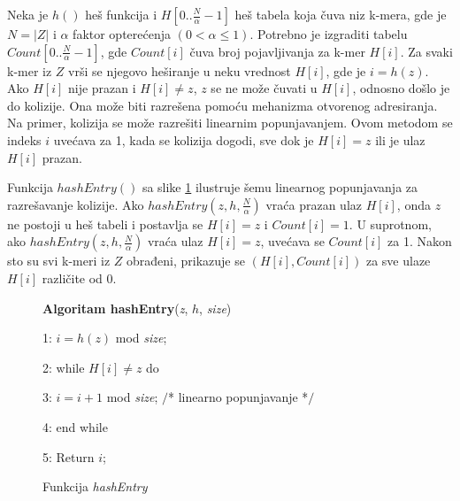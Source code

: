 \documentclass[12pt,oneside]{memoir}
\begin{document}
Neka je $h()$ heš funkcija i $H[0..\frac{N}{\alpha} - 1]$ heš tabela koja čuva niz k-mera, gde je $N = |Z|$ i $\alpha$ faktor opterećenja $(0 < \alpha \leq 1)$. Potrebno je izgraditi tabelu $Count[0..\frac{N}{\alpha} - 1]$, gde $Count[i]$ čuva broj pojavljivanja za k-mer $H[i]$. Za svaki k-mer iz $Z$ vrši se njegovo  heširanje u neku vrednost $H[i]$, gde je $i = h(z)$. Ako $H[i]$ nije prazan i $H[i] \neq z$, $z$ se ne može čuvati u $H[i]$, odnosno došlo je do kolizije. Ona može biti razrešena pomoću mehanizma otvorenog adresiranja. Na primer, kolizija se može razrešiti linearnim popunjavanjem. Ovom metodom se indeks $i$ uvećava za 1, kada se kolizija dogodi, sve dok je $H[i] = z$ ili je ulaz $H[i]$ prazan.

\begin{comment}

\begin{figure}[!ht]
  \centering
  \texttt{[image: HashEntry.PNG]}
  \caption{Funkcija hashEntry \cite{WingKinSung}}
  \label{fig:hashEntry}
\end{figure}

\end{comment}

Funkcija $hashEntry()$ sa slike \ref{box:hashEntry} ilustruje šemu linearnog popunjavanja za razrešavanje kolizije. Ako $hashEntry(z, h, \frac{N}{\alpha})$ vraća prazan ulaz $H[i]$, onda $z$ ne postoji u heš tabeli i postavlja se $H[i] = z$ i $Count[i] = 1$. U suprotnom, ako $hashEntry(z, h, \frac{N}{\alpha})$ vraća ulaz $H[i] = z$, uvećava se $Count[i]$ za 1. Nakon sto su svi k-meri iz $Z$ obrađeni, prikazuje se $(H[i], Count[i])$ za sve ulaze $H[i]$ različite od 0.

\begin{figure}[!ht]
\begin{tcolorbox}
\textbf{Algoritam hashEntry}(\textit{z}, $h$, \textit{size})

1: $i = h(z)$ mod \textit{size};

2: while $H[i] \neq z$ do

3:\hspace{1cm} $i = i + 1$ mod \textit{size}; $/$* linearno popunjavanje *$/$

4: end while

5: Return $i$;
\end{tcolorbox}
\caption{Funkcija \textit{hashEntry} \cite{WingKinSung}}
\label{box:hashEntry}
\end{figure}
\end{document}
